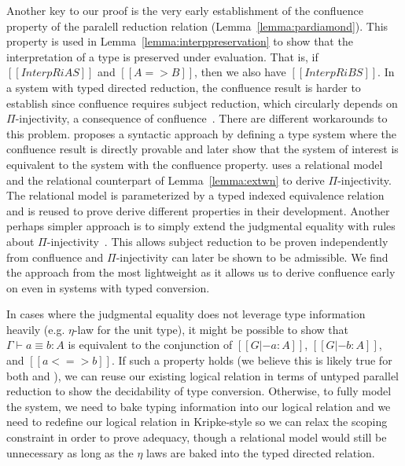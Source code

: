 \documentclass[acmsmall]{acmart}
\begin{document}

Another key to our proof is the very early establishment of the confluence
property of the paralell reduction relation
(Lemma~\ref{lemma:pardiamond}). This property is used in
Lemma~\ref{lemma:interppreservation} to show that the interpretation
of a type is preserved under evaluation. That is, if $[[InterpR i A
S]]$ and $[[A => B]]$, then we also have $[[InterpR i B S]]$.
In a system with typed directed reduction, the confluence result is
harder to establish since confluence requires subject reduction, which
circularly depends on $\Pi$-injectivity, a consequence of
confluence~\citep{siles2012pure}. There are different workarounds to
this problem. \citet{siles2012pure} proposes a syntactic approach by
defining a type system where the confluence result is
directly provable and later show that the system of interest is
equivalent to the system with the confluence property.
\citet{decagda} uses a relational model and the relational counterpart
of Lemma~\ref{lemma:extwn} to derive $\Pi$-injectivity. The relational
model is parameterized by a typed indexed equivalence relation and
is reused to prove derive different properties in their
development. Another perhaps simpler approach is to simply
extend the judgmental equality with rules about
$\Pi$-injectivity~\citep{weirich:systemd}. This allows subject
reduction to be proven independently from confluence and
$\Pi$-injectivity can later be shown to be admissible. We find the
approach from \citep{weirich:systemd} the most lightweight as it
allows us to derive confluence early on even in systems with typed
conversion.

In cases where the judgmental equality does not leverage type information heavily
(e.g. $\eta$-law for the unit type), it might be possible to show that
$\Gamma \vdash a \equiv b : A$ is equivalent to the conjunction of
$[[G |- a : A]]$, $[[G |- b : A ]]$, and $[[a <=> b]]$. If such a
property holds (we believe this is likely true for both
\citet{decagda} and \citet{martin-lof-a-la-coq}), we can reuse our existing logical relation in
terms of untyped parallel reduction to show the decidability of type
conversion. Otherwise, to fully model the system, we need to bake
typing information into our logical relation and we need to redefine
our logical relation in Kripke-style so we can relax the scoping
constraint in order to prove adequacy, though a relational model would
still be unnecessary as long as the $\eta$ laws are baked into the
typed directed relation.
\end{document}
